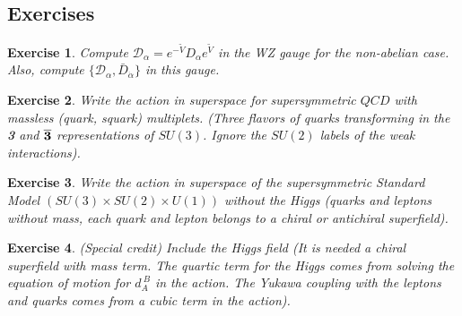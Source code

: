 \documentclass[a4paper,12pt]{article}
\newtheorem{exe}{Exercise}
\numberwithin{equation}{section}
\numberwithin{exe}{section}
\newcommand{\Db}{{\bar D}}
\newcommand{\Dc}{{\mathcal D}}
\newcommand{\Fb}{{\bar F}}
\newcommand{\Wb}{{\bar W}}
\newcommand{\Vt}{{\tilde V}}
\renewcommand{\a}{{\alpha}}
\newcommand{\ad}{{\dot\alpha}}
\renewcommand{\l}{{\lambda}}
\newcommand{\lb}{{\bar\lambda}}
\renewcommand{\sb}{{\bar\sigma}}
\renewcommand{\t}{{\theta}}
\newcommand{\tb}{{\bar\theta}}
\newcommand{\vphi}{{\varphi}}
\newcommand{\vphib}{{\bar\varphi}}
\newcommand{\psib}{{\bar\psi}}
\begin{document}
%

\subsection{Exercises}

	\begin{exe}
	Compute $\Dc_\a = e^{-\widetilde V} D_\a e^{\widetilde V}$ in the WZ gauge for the non-abelian case. Also, compute $\{\Dc_\a, \Db_\ad\}$ in this gauge.
	\end{exe}

	\begin{exe}
	Write the action in superspace for supersymmetric $QCD$ with massless (quark, squark) multiplets. (Three flavors of quarks transforming in the {\bf 3} and $\overline{{\bf 3}}$ representations of $SU(3)$. Ignore the $SU(2)$ labels of the weak interactions).
	\end{exe}

	\begin{exe}
	Write the action in superspace of the supersymmetric Standard Model $(SU(3)\times SU(2)\times U(1))$ without the Higgs (quarks and leptons without mass, each quark and lepton belongs to a chiral or antichiral superfield).
	\end{exe}

	\begin{exe}
	(Special credit) Include the Higgs field (It is needed a chiral superfield with mass term. The quartic term for the Higgs comes from solving the equation of motion for $d_A^{\ B}$ in the action. The Yukawa coupling with the leptons and quarks comes from a cubic term in the action).
	\end{exe}
\end{document}
